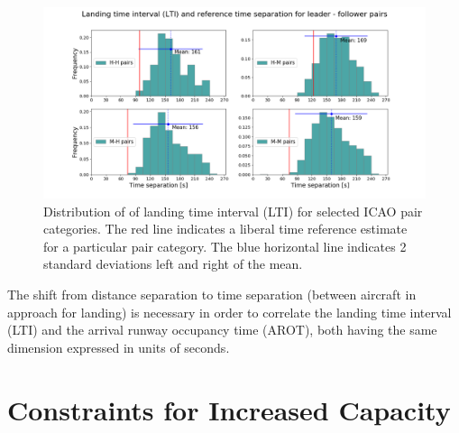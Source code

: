 \begin{figure}[h]
    \centering
    \includegraphics[width=1\textwidth]{graphics/fig_time_separ_HH_HM_MH_MM_pairs.png}
    \caption[Distribution of landing time interval (LTI) for ICAO pairs]{Distribution of of landing time interval (LTI) for selected ICAO pair categories. The red line indicates a liberal time reference estimate for a particular pair category. The blue horizontal line indicates 2 standard deviations left and right of the mean.}
    \label{fig:time_separ_HH_HM_MH_MM_pairs}
\end{figure}

The shift from distance separation to time separation (between aircraft in approach for landing) is necessary in order to correlate the landing time interval (LTI) and the arrival runway occupancy time (AROT), both having the same dimension expressed in units of seconds.






\section{Constraints for Increased Capacity}%

